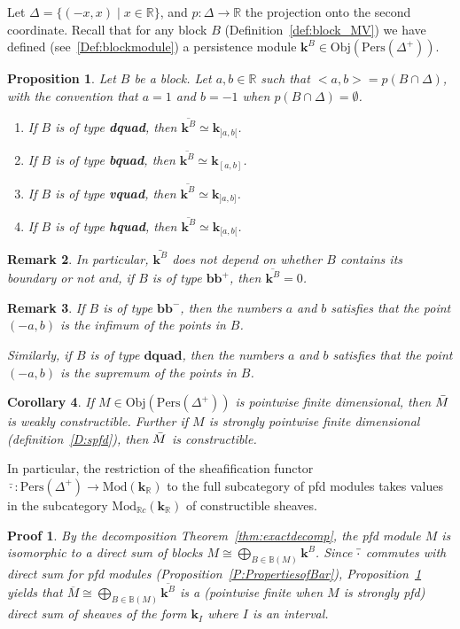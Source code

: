 \documentclass[a4paper, english, 11pt]{article}
\newcommand{\kk}[0]{\textbf{k}}
\newcommand{\Mod}[0]{\text{Mod}}
\newcommand{\Pe}{\text{Pers}}
\newcommand{\0}{\vec{0}}
\newcommand{\R}[0]{\mathbb{R}}
\newcommand{\Obj}[0]{\text{Obj}}
\newtheorem{prop}{Proposition}[section]
\newtheorem*{pf}{Proof} }
\newtheorem{cor}[prop]{Corollary}
\newtheorem{remark}[prop]{Remark}
\begin{document}
Let $\Delta = \{(-x,x)\mid x\in\R\}$, and $p : \Delta \longrightarrow \R$ the projection onto the second coordinate. Recall that for any block $B$ (Definition~\ref{def:block_MV}) we have defined (see~\ref{Def:blockmodule}) a persistence module $\kk^B\in \Obj(\Pe(\Delta^+))$.
\begin{prop}\label{P:BarofBlock}
Let $B$ be a block. Let $a,b\in \R$ such that $<a,b> = p(B\cap \Delta)$, with the convention that $a=1$ and $b=-1$ when $ p(B\cap \Delta) = \emptyset$.  
\begin{enumerate}
    \item If $B$ is of type \textbf{dquad}, then $\overline{\kk^B} \simeq \kk_{]a,b[}$.
    \item If $B$ is of type \textbf{bquad}, then $\overline{\kk^B} \simeq \kk_{[a,b]}$.
    \item If $B$ is of type \textbf{vquad}, then $\overline{\kk^B} \simeq \kk_{]a,b]}$.
    \item If $B$ is of type \textbf{hquad}, then $\overline{\kk^B} \simeq \kk_{[a,b[}$.
\end{enumerate}
\end{prop}
\begin{remark}
In particular, $\bar{\kk^B}$ does not depend on whether $B$ contains its boundary or not and, if $B$ is of type $\textbf{bb}^+$, then $\overline{\kk^B} =0$. 
\end{remark}
\begin{remark}\label{R:caracofab}
 If $B$ is of type $\textbf{bb}^-$, then the numbers $a$ and $b$ satisfies that the point $(-a,b)$ is the infimum of the points in $B$.
 
 Similarly, if $B$ is of type $\textbf{dquad}$, then the numbers $a$ and $b$ satisfies that the point $(-a,b)$ is the supremum of the points in $B$.
\end{remark}


\begin{cor}\label{C:pfdimpliesconstructible}
 If $M \in \Obj(\Pe(\Delta^{+}))$ is pointwise finite dimensional, then $\Bar{M}$ is weakly constructible. 
 Further if $M$ is strongly pointwise finite dimensional (definition~\ref{D:spfd}), then $\Bar{M}$ is constructible. 
\end{cor}
In particular, the restriction of the sheafification functor $\bar{\cdot}:\Pe(\Delta^{+})\to \Mod(\kk_\R)$ to the full subcategory of pfd modules takes values in the subcategory $ \Mod_{\R c}(\kk_\R)$ of constructible sheaves.
\begin{pf}
 By the decomposition Theorem~\ref{thm:exactdecomp}, the pfd module $M$ is isomorphic to a direct sum of blocks $M\cong  \bigoplus_{B\in \mathbb{B}(M)} \kk^B$. Since $\Bar{\cdot}$ commutes with direct sum for pfd modules (Proposition~\ref{P:PropertiesofBar}), Proposition~\ref{P:BarofBlock} yields that $\overline{M} \cong \bigoplus_{B\in \mathbb{B}(M)} \overline{\kk^B} $ is a (pointwise finite when $M$ is strongly pfd) direct sum of sheaves of the form $\kk_{I}$ where $I$ is an interval. 
\end{pf}
\end{document}
